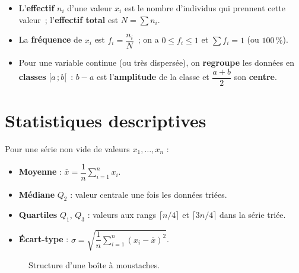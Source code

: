 \begin{defn}
\begin{itemize}
  \item L'\textbf{effectif} $n_i$ d'une valeur $x_i$ est le nombre d'individus
        qui prennent cette valeur~; l'\textbf{effectif total} est $N=\sum n_i$.
  \item La \textbf{fr\'equence} de $x_i$ est $f_i=\dfrac{n_i}{N}$~; on a
        $0\leq f_i\leq1$ et $\sum f_i=1$ (ou $100\,\%$).
  \item Pour une variable continue (ou tr\`es dispers\'ee), on \textbf{regroupe}
        les donn\'ees en \textbf{classes} $[a\,;b[$~: $b-a$ est l'\textbf{amplitude}
        de la classe et $\dfrac{a+b}{2}$ son \textbf{centre}.
\end{itemize}
\end{defn}

\section{Statistiques descriptives}

\begin{defn}
Pour une s\'erie non vide de valeurs $x_1,\ldots,x_n$ :
\begin{itemize}
  \item \textbf{Moyenne} : $\bar{x} = \dfrac{1}{n}\displaystyle\sum_{i=1}^n x_i$.
  \item \textbf{M\'ediane} $Q_2$ : valeur centrale une fois les donn\'ees tri\'ees.
  \item \textbf{Quartiles} $Q_1$, $Q_3$ \ExtensionTTen : valeurs aux rangs $\lceil n/4\rceil$ et $\lceil3n/4\rceil$ dans la s\'erie tri\'ee.
  \item \textbf{\'Ecart-type} :
        $\sigma = \sqrt{\dfrac{1}{n}\displaystyle\sum_{i=1}^n (x_i - \bar{x})^2}$.
\end{itemize}
\end{defn}

\begin{figure}[H]
\centering
{}
\caption{Structure d'une bo\^ite \`a moustaches.}
\end{figure}

